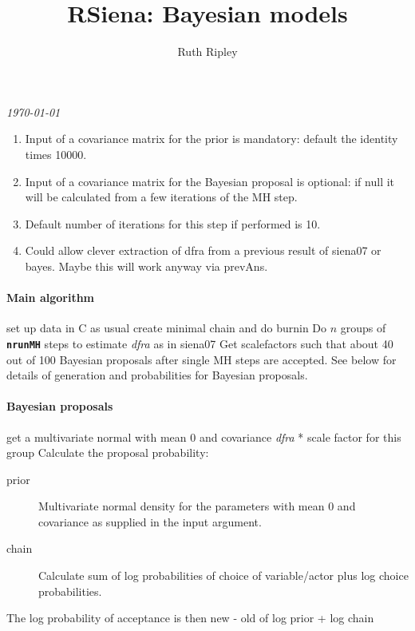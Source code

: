 \documentclass[12pt,a4paper]{article}
\renewcommand{\=}{\,=\,}
\newcommand{\+}{\,+\,}
\newcommand{\nnm}[1]{\textsf{\small\textit{#1}}}
\newcommand{\sfn}[1]{\textbf{\texttt{#1}}}
\begin{document}
\title{RSiena: Bayesian models}
\author{Ruth Ripley}
\date{}
\maketitle

\centerline{\emph{\today}}
\bigskip
\begin{enumerate}
\item Input of a covariance matrix for the prior is mandatory: default the
  identity times 10000.
\item Input of a covariance matrix for the Bayesian proposal is optional: if
  null it will be calculated from a few iterations of the MH step.
\item Default number of iterations for this step if performed is 10.
\item Could allow clever extraction of dfra from a previous result of siena07 or
  bayes. Maybe this will work anyway via prevAns.
\end{enumerate}
\paragraph{Main algorithm}
\begin{algorithmic}
\STATE set up data in C as usual
\STATE create minimal chain and do burnin
\STATE Do $n$ groups of \sfn{nrunMH} steps to estimate \nnm{dfra} as in siena07
\STATE Get scalefactors such that about 40 out of 100 Bayesian proposals after
single MH steps are accepted. See below for details of
generation and probabilities for Bayesian proposals.

\end{algorithmic}
\paragraph{Bayesian proposals}
\label{sec:prop}
\begin{algorithmic}
\STATE get a multivariate normal with mean 0 and covariance \nnm{dfra} *
scale factor for this group
\STATE Calculate the proposal probability:
\begin{description}
\item[prior] Multivariate normal density for the parameters with mean 0
  and covariance as supplied in the input argument.
\item[chain] Calculate sum of log probabilities of choice of variable/actor
plus log choice probabilities.
\end{description}
\STATE The log probability of acceptance is then new - old  of log prior +
log chain
\ENDFOR
\end{algorithmic}
\end{document}
